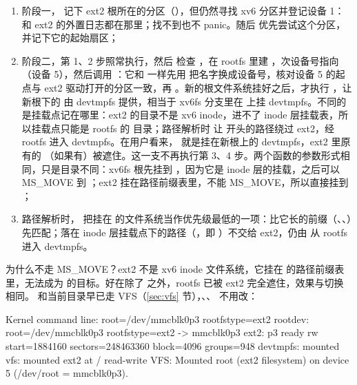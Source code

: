 \begin{enumerate}
  \item 阶段一， 记下 ext2 根所在的分区（），但仍然寻找 xv6 分区并登记设备 1： 和 ext2 的外置日志都在那里；找不到也不 panic。随后  优先尝试这个分区，并记下它的起始扇区；
  \item 阶段二，第 1、2 步照常执行，然后  检查 ，在 rootfs 里建 ，次设备号指向 （设备 5），然后调用 ：它和  一样先用  把名字换成设备号，核对设备 5 的起点与 ext2 驱动打开的分区一致，再 。新的根文件系统挂好之后，才执行 ，让新根下的  由 devtmpfs 提供，相当于 xv6fs 分支里在  上挂 devtmpfs。不同的是挂载点记在哪里：ext2 的目录不是 xv6 inode，进不了 inode 层挂载表，所以挂载点只能是 rootfs 的  目录；路径解析时  让  开头的路径绕过 ext2，经 rootfs 进入 devtmpfs。在用户看来， 就是挂在新根上的 devtmpfs，ext2 里原有的 （如果有）被遮住。这一支不再执行第 3、4 步。两个函数的参数形式相同，只是目录不同：xv6fs 根先挂到 ，因为它是 inode 层的挂载，之后可以 MS\_MOVE 到 \code{/}；ext2 挂在路径前缀表里，不能 MS\_MOVE，所以直接挂到 \code{/}；
  \item 路径解析时， 把挂在 \code{/} 的文件系统当作优先级最低的一项：比它长的前缀（、、）先匹配；落在 inode 层挂载点下的路径（，即 ）不交给 ext2，仍由  从 rootfs 进入 devtmpfs。
\end{enumerate}

为什么不走 MS\_MOVE？ext2 不是 xv6 inode 文件系统，它挂在  的路径前缀表里，无法成为  的目标。好在除了  之外，rootfs 已被 ext2 完全遮住，效果与切换相同。 和当前目录早已走 VFS（\ref{sec:vfs} 节），、、 不用改：

\begin{txtcode}
Kernel command line: root=/dev/mmcblk0p3 rootfstype=ext2
rootdev: root=/dev/mmcblk0p3 rootfstype=ext2 -> mmcblk0p3
ext2: p3 ready rw start=1884160 sectors=248463360 block=4096 groups=948
devtmpfs: mounted
vfs: mounted ext2 at / read-write
VFS: Mounted root (ext2 filesystem) on device 5 (/dev/root = mmcblk0p3).
\end{txtcode}


